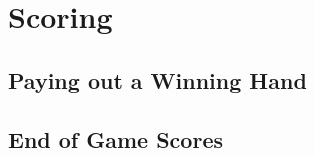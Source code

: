 \section{Scoring}\label{core:sec:scoring}

\subsection{Paying out a Winning Hand}\label{core:sec:paying-hand}

\subsection{End of Game Scores}\label{core:sec:end-scores}
